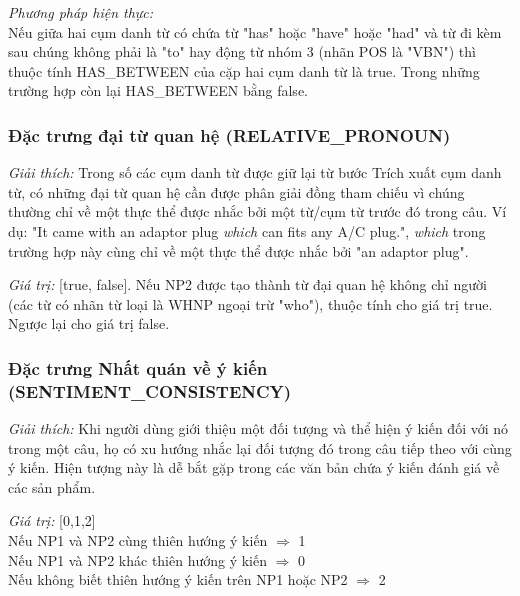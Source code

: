 \documentclass[12pt]{report}
\begin{document}
					\par \textit{Phương pháp hiện thực:}
					\\Nếu giữa hai cụm danh từ có chứa từ "has" hoặc "have" hoặc "had" và từ đi kèm sau chúng không phải là "to" hay động từ nhóm 3 (nhãn POS là "VBN") thì thuộc tính HAS\_BETWEEN của cặp hai cụm danh từ là true. Trong những trường hợp còn lại HAS\_BETWEEN bằng false.

				\subsubsection*{Đặc trưng đại từ quan hệ (RELATIVE\_PRONOUN)}
					\par \textit{Giải thích:} Trong số các cụm danh từ được giữ lại từ bước Trích xuất cụm danh từ, có những đại từ quan hệ cần được phân giải đồng tham chiếu vì chúng thường chỉ về một thực thể được nhắc bởi một từ/cụm từ trước đó trong câu. Ví dụ: "It came with an adaptor plug \textit{which} can fits any A/C plug.", \textit{which} trong trường hợp này cùng chỉ về một thực thể được nhắc bởi "an adaptor plug".
					\par \textit{Giá trị:} [true, false]. Nếu NP2 được tạo thành từ đại quan hệ không chỉ người (các từ có nhãn từ loại là WHNP ngoại trừ "who"), thuộc tính cho giá trị true. Ngược lại cho giá trị false. 
	 
				\subsubsection*{Đặc trưng Nhất quán về ý kiến (SENTIMENT\_CONSISTENCY)}
					\par \textit{Giải thích:} Khi người dùng giới thiệu một đối tượng và thể hiện ý kiến đối với nó trong một câu, họ có xu hướng nhắc lại đối tượng đó trong câu tiếp theo với cùng ý kiến. Hiện tượng này là dễ bắt gặp trong các văn bản chứa ý kiến đánh giá về các sản phẩm.
					\par \textit{Giá trị:} [0,1,2]
					\\Nếu NP1 và NP2 cùng thiên hướng ý kiến $\Rightarrow$ 1
					\\Nếu NP1 và NP2 khác thiên hướng ý kiến $\Rightarrow$ 0
					\\Nếu không biết thiên hướng ý kiến trên NP1 hoặc NP2 $\Rightarrow$ 2
\end{document}

